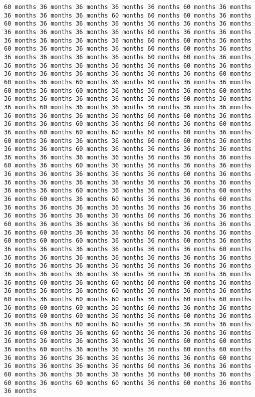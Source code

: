\documentclass[11pt]{article}
\begin{document}
\begin{Verbatim}[commandchars=\\\{\}, frame=single, framerule=2mm, rulecolor=\color{outerrorbackground}]
60 months 36 months 36 months 36 months 36 months 60 months 36 months 36 months 36 months 36 months 60 months 60 months 60 months 36 months 60 months 36 months 36 months 36 months 36 months 36 months 36 months 36 months 36 months 36 months 36 months 60 months 36 months 36 months 36 months 36 months 36 months 36 months 60 months 60 months 36 months 60 months 36 months 36 months 36 months 60 months 60 months 36 months 36 months 36 months 36 months 36 months 60 months 60 months 36 months 36 months 36 months 36 months 36 months 36 months 60 months 36 months 36 months 36 months 36 months 36 months 36 months 36 months 60 months 60 months 36 months 60 months 36 months 60 months 36 months 36 months 60 months 36 months 60 months 36 months 36 months 36 months 60 months 36 months 36 months 36 months 36 months 36 months 60 months 36 months 36 months 60 months 36 months 36 months 36 months 36 months 36 months 36 months 36 months 36 months 36 months 60 months 60 months 36 months 36 months 36 months 60 months 36 months 60 months 36 months 60 months 36 months 60 months 60 months 60 months 60 months 60 months 36 months 60 months 36 months 36 months 36 months 60 months 60 months 36 months 36 months 36 months 60 months 36 months 36 months 36 months 36 months 36 months 36 months 36 months 36 months 36 months 36 months 36 months 60 months 36 months 60 months 36 months 36 months 36 months 36 months 36 months 36 months 36 months 36 months 36 months 60 months 36 months 36 months 36 months 36 months 36 months 36 months 36 months 36 months 36 months 36 months 60 months 36 months 36 months 36 months 60 months 36 months 60 months 36 months 60 months 36 months 36 months 60 months 36 months 36 months 36 months 36 months 36 months 36 months 36 months 36 months 36 months 36 months 36 months 60 months 36 months 36 months 60 months 36 months 36 months 36 months 60 months 36 months 36 months 36 months 60 months 36 months 36 months 60 months 36 months 36 months 60 months 60 months 60 months 36 months 36 months 60 months 36 months 36 months 36 months 36 months 36 months 36 months 36 months 60 months 36 months 36 months 36 months 36 months 36 months 36 months 36 months 36 months 36 months 36 months 36 months 36 months 36 months 36 months 36 months 36 months 36 months 36 months 36 months 36 months 36 months 36 months 60 months 36 months 60 months 60 months 60 months 36 months 36 months 36 months 36 months 60 months 36 months 36 months 36 months 60 months 36 months 60 months 60 months 36 months 60 months 60 months 36 months 60 months 60 months 36 months 60 months 36 months 36 months 36 months 60 months 60 months 36 months 36 months 60 months 36 months 36 months 36 months 60 months 60 months 36 months 36 months 36 months 36 months 60 months 36 months 60 months 36 months 36 months 36 months 36 months 36 months 36 months 36 months 36 months 60 months 60 months 36 months 60 months 36 months 36 months 36 months 60 months 60 months 36 months 36 months 36 months 36 months 36 months 36 months 60 months 36 months 36 months 36 months 36 months 60 months 36 months 36 months 60 months 36 months 36 months 36 months 36 months 60 months 36 months 60 months 36 months 60 months 60 months 36 months 60 months 36 months 36 months 
\end{Verbatim}
\end{document}
